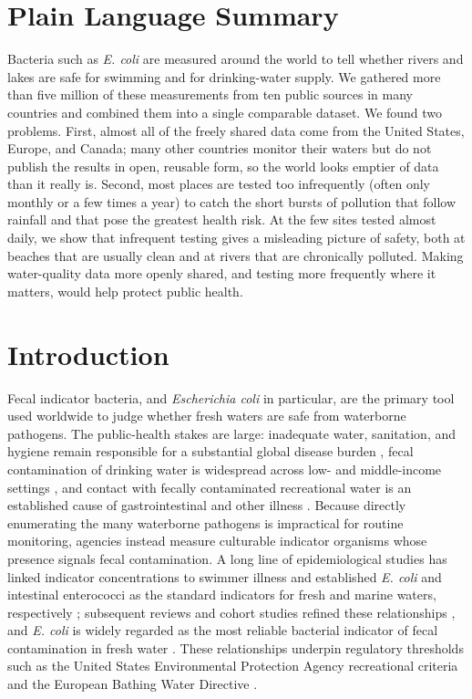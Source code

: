 \documentclass{agujournal2019}
\begin{document}
\section*{Plain Language Summary}
Bacteria such as \textit{E. coli} are measured around the world to tell whether rivers and lakes are safe for swimming and for drinking-water supply. We gathered more than five million of these measurements from ten public sources in many countries and combined them into a single comparable dataset. We found two problems. First, almost all of the freely shared data come from the United States, Europe, and Canada; many other countries monitor their waters but do not publish the results in open, reusable form, so the world looks emptier of data than it really is. Second, most places are tested too infrequently (often only monthly or a few times a year) to catch the short bursts of pollution that follow rainfall and that pose the greatest health risk. At the few sites tested almost daily, we show that infrequent testing gives a misleading picture of safety, both at beaches that are usually clean and at rivers that are chronically polluted. Making water-quality data more openly shared, and testing more frequently where it matters, would help protect public health.

\section{Introduction}

Fecal indicator bacteria, and \textit{Escherichia coli} in particular, are the primary tool used worldwide to judge whether fresh waters are safe from waterborne pathogens. The public-health stakes are large: inadequate water, sanitation, and hygiene remain responsible for a substantial global disease burden \cite{prssustn2014burden,prssstn2019burden,wolf2023burden}, fecal contamination of drinking water is widespread across low- and middle-income settings \cite{bain2014fecal,bain2014global}, and contact with fecally contaminated recreational water is an established cause of gastrointestinal and other illness \cite{gerdes2023estimating,wade2022health,zmirou2003risks}. Because directly enumerating the many waterborne pathogens is impractical for routine monitoring, agencies instead measure culturable indicator organisms whose presence signals fecal contamination. A long line of epidemiological studies has linked indicator concentrations to swimmer illness and established \textit{E. coli} and intestinal enterococci as the standard indicators for fresh and marine waters, respectively ; subsequent reviews and cohort studies refined these relationships \cite{prss1998review,wade2003environmental,wade2005rapidly,wade2010rapidly}, and \textit{E. coli} is widely regarded as the most reliable bacterial indicator of fecal contamination in fresh water \cite{edberg2000escherichia,boehm2014enterococci,korajkic2018relationships}. These relationships underpin regulatory thresholds such as the United States Environmental Protection Agency recreational criteria and the European Bathing Water Directive \cite{epa2012recreational,eu2006bathing,who2021recreational,boehm2008sea}.
\end{document}
